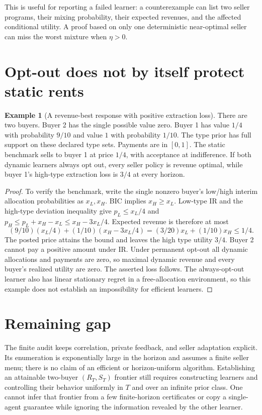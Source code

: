 \documentclass[11pt]{article}
\theoremstyle{definition}
\newtheorem{example}[theorem]{Example}
\theoremstyle{remark}
\begin{document}
This is useful for reporting a failed learner: a counterexample can list two seller programs, their mixing probability, their expected revenues, and the affected conditional utility. A proof based on only one deterministic near-optimal seller can miss the worst mixture when $\eta>0$.

\section{Opt-out does not by itself protect static rents}
\begin{example}[A revenue-best response with positive extraction loss]
There are two buyers. Buyer 2 has the single possible value zero. Buyer 1 has value $1/4$ with probability $9/10$ and value $1$ with probability $1/10$. The type prior has full support on these declared type sets. Payments are in $[0,1]$. The static benchmark sells to buyer 1 at price $1/4$, with acceptance at indifference. If both dynamic learners always opt out, every seller policy is revenue optimal, while buyer 1's high-type extraction loss is $3/4$ at every horizon.
\end{example}
\begin{proof}
To verify the benchmark, write the single nonzero buyer's low/high interim allocation probabilities as $x_L,x_H$. BIC implies $x_H\ge x_L$. Low-type IR and the high-type deviation inequality give $p_L\le x_L/4$ and $p_H\le p_L+x_H-x_L\le x_H-3x_L/4$. Expected revenue is therefore at most
\[
 (9/10)(x_L/4)+(1/10)(x_H-3x_L/4)
 = (3/20)x_L+(1/10)x_H\le1/4.
\]
The posted price attains the bound and leaves the high type utility $3/4$. Buyer 2 cannot pay a positive amount under IR. Under permanent opt-out all dynamic allocations and payments are zero, so maximal dynamic revenue and every buyer's realized utility are zero. The asserted loss follows. The always-opt-out learner also has linear stationary regret in a free-allocation environment, so this example does not establish an impossibility for efficient learners.
\end{proof}

\section{Remaining gap}
The finite audit keeps correlation, private feedback, and seller adaptation explicit. Its enumeration is exponentially large in the horizon and assumes a finite seller menu; there is no claim of an efficient or horizon-uniform algorithm. Establishing an attainable two-buyer $(R_T,S_T)$ frontier still requires constructing learners and controlling their behavior uniformly in $T$ and over an infinite prior class. One cannot infer that frontier from a few finite-horizon certificates or copy a single-agent guarantee while ignoring the information revealed by the other learner.
\end{document}
